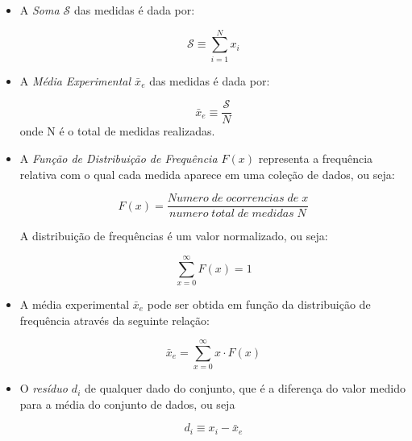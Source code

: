 \documentclass[11pt,a4paper]{article}
\begin{document}
        \begin{itemize}
            \item A \textit{\textcolor{CarnationPink}{Soma $\mathcal{S}$}} das medidas é dada por:
              
                \begin{equation}
                	\mathcal{S}  \equiv  \sum_{i = 1}^{N} x_i  
                \end{equation}

            \item A \textit{\textcolor{CarnationPink}{Média Experimental $\bar{x}_e$}} das medidas é dada por:
              
                	\begin{equation}
                  	\bar{x}_e \equiv  \frac{\mathcal{S}}{N}
                	\end{equation}
              		onde N é o total de medidas realizadas. 


            \item A \textit{\textcolor{CarnationPink}{Função de Distribuição de Frequência $F(x)$}} representa a frequência relativa com o qual cada medida aparece em uma coleção de dados, ou seja:
              
					\begin{equation}
					F(x) = \frac{Numero \; de \; ocorrencias \; de \;x}{numero \; total \; de \; medidas \; N}
					\end{equation}

					A distribuição de frequências é um valor normalizado, ou seja:

					\begin{equation}
					\sum_{x = 0}^{\infty} F(x) = 1 
					\end{equation}

			\item A média experimental $\bar{x}_e$ pode ser obtida em função da distribuição de frequência através da seguinte relação:
				
					\begin{equation}
						\bar{x}_e = \sum_{x = 0}^{\infty} x \cdot F(x)
					\end{equation}

			\item O \textit{\textcolor{CarnationPink}{resíduo $d_i$}} de qualquer dado do conjunto, que é a diferença do valor medido para a média do conjunto de dados, ou seja
				
					\begin{equation}
						d_i \equiv x_i - \bar{x}_e
					\end{equation}


\end{itemize}
\end{document}
